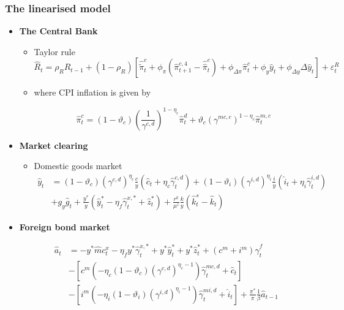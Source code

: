 \documentclass[9pt]{beamer}
\begin{document}
\begin{frame}[noframenumbering]
\frametitle{The linearised model}
\begin{itemize}
\label{DomUnit6}


    \item \textbf{The Central Bank}
    \begin{itemize}
        \item Taylor rule
    $$
    \hat{R}_{t}=\rho_{R} \hat{R}_{t-1}+\left(1-\rho_{R}\right)\left[\hat{\tilde{\pi}}_{t}^{c}+\phi_{\pi}\left(\hat{\pi}_{t+1}^{c, 4}-\hat{\hat{\pi}}_{t}^{c}\right)+\phi_{\Delta \pi} \hat{\pi}_{t}^{c}+\phi_{y} \hat{y}_{t}+\phi_{\Delta y} \Delta \hat{y}_{t}\right]+\varepsilon_{t}^{R}
    $$
    
    \item where CPI inflation is given by
    
    $$
    \hat{\pi}_{t}^{c}=\left(1-\vartheta_{c}\right)\left(\frac{1}{\gamma^{c, d}}\right)^{1-\eta_{\epsilon}} \hat{\pi}_{t}^{d}+\vartheta_{c}\left(\gamma^{m c, c}\right)^{1-\eta_{c}} \hat{\pi}_{t}^{m, c}
    $$

    \end{itemize}
\hyperlink{frame6}{}

    \item \textbf{Market clearing}
    \begin{itemize}
        \item Domestic goods market
    $$
    \begin{aligned}
    \hat{y}_{t} &=\left(1-\vartheta_{c}\right)\left(\gamma^{c, d}\right)^{\eta_{c}} \frac{c}{y}\left(\hat{c}_{t}+\eta_{c} \hat{\gamma}_{t}^{c, d}\right)+\left(1-\vartheta_{i}\right)\left(\gamma^{i, d}\right)^{\eta_{i}} \frac{i}{y}\left(\hat{i}_{t}+\eta_{i} \hat{\gamma}_{t}^{i, d}\right) \\
    &+g_{y} \hat{g}_{t}+\frac{y^{*}}{y}\left(\hat{y}_{t}^{*}-\eta_{f} \hat{\gamma}_{t}^{x, *}+\hat{z}_{t}^{*}\right)+\frac{r^{k}}{\mu^{z}} \frac{k}{y}\left(\hat{k}_{t}^{s}-\hat{k}_{t}\right)
    \end{aligned}
    $$
    
    \end{itemize}
    
    \item \textbf{Foreign bond market}

    \begin{itemize}
    $$
    \begin{aligned}
    \hat{a}_{t} &=-y^{*} \hat{m} c_{t}^{x}-\eta_{f} y^{*} \hat{\gamma}_{t}^{x, *}+y^{*} \hat{y}_{t}^{*}+y^{*} \hat{z}_{t}^{*}+\left(c^{m}+i^{m}\right) \hat{\gamma}_{t}^{f} \\
    &-\left[c^{m}\left(-\eta_{c}\left(1-\vartheta_{c}\right)\left(\gamma^{c, d}\right)^{\eta_{c}-1}\right) \hat{\gamma}_{t}^{m c, d}+\hat{c}_{t}\right] \\
    &-\left[i^{m}\left(-\eta_{i}\left(1-\vartheta_{i}\right)\left(\gamma^{i, d}\right)^{\eta_{i}-1}\right) \hat{\gamma}_{t}^{m i, d}+\hat{i}_{t}\right] 
    +\frac{\pi^{*}}{\pi} \frac{1}{\beta} \hat{a}_{t-1}
    \end{aligned}
    $$
        

\end{itemize}
\end{itemize}
\end{frame}
\end{document}
